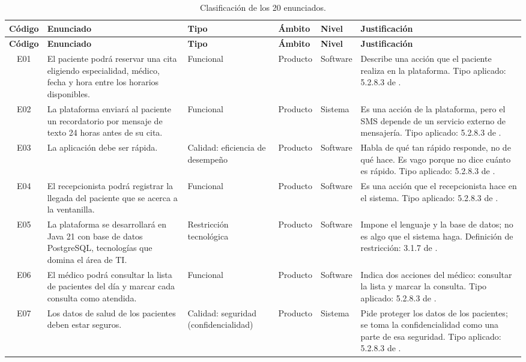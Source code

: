 \documentclass[11pt,a4paper]{article}
\begin{document}
\begingroup\footnotesize
\setlength{\tabcolsep}{3pt}
\renewcommand{\arraystretch}{1.18}
\begin{longtable}{|c|L{4.0cm}|L{2.3cm}|L{1.7cm}|L{1.7cm}|L{3.4cm}|}
\caption{Clasificación de los 20 enunciados.}\label{tab:clasificacion}\\
\hline
\textbf{Código} & \textbf{Enunciado} & \textbf{Tipo} & \textbf{Ámbito} & \textbf{Nivel} & \textbf{Justificación} \\
\hline
\endfirsthead
\hline
\textbf{Código} & \textbf{Enunciado} & \textbf{Tipo} & \textbf{Ámbito} & \textbf{Nivel} & \textbf{Justificación} \\
\hline
\endhead
E01 & El paciente podrá reservar una cita eligiendo especialidad, médico, fecha y hora entre los horarios disponibles. & Funcional & Producto & Software & Describe una acción que el paciente realiza en la plataforma. Tipo aplicado: 5.2.8.3 de \cite{iso29148}. \\ \hline
E02 & La plataforma enviará al paciente un recordatorio por mensaje de texto 24 horas antes de su cita. & Funcional & Producto & Sistema & Es una acción de la plataforma, pero el SMS depende de un servicio externo de mensajería. Tipo aplicado: 5.2.8.3 de \cite{iso29148}. \\ \hline
E03 & La aplicación debe ser rápida. & Calidad: eficiencia de desempeño & Producto & Software & Habla de qué tan rápido responde, no de qué hace. Es vago porque no dice cuánto es rápido. Tipo aplicado: 5.2.8.3 de \cite{iso29148}. \\ \hline
E04 & El recepcionista podrá registrar la llegada del paciente que se acerca a la ventanilla. & Funcional & Producto & Software & Es una acción que el recepcionista hace en el sistema. Tipo aplicado: 5.2.8.3 de \cite{iso29148}. \\ \hline
E05 & La plataforma se desarrollará en Java 21 con base de datos PostgreSQL, tecnologías que domina el área de TI. & Restricción tecnológica & Producto & Software & Impone el lenguaje y la base de datos; no es algo que el sistema haga. Definición de restricción: 3.1.7 de \cite{iso29148}. \\ \hline
E06 & El médico podrá consultar la lista de pacientes del día y marcar cada consulta como atendida. & Funcional & Producto & Software & Indica dos acciones del médico: consultar la lista y marcar la consulta. Tipo aplicado: 5.2.8.3 de \cite{iso29148}. \\ \hline
E07 & Los datos de salud de los pacientes deben estar seguros. & Calidad: seguridad (confidencialidad) & Producto & Sistema & Pide proteger los datos de los pacientes; se toma la confidencialidad como una parte de esa seguridad. Tipo aplicado: 5.2.8.3 de \cite{iso29148}. \\ \hline

\end{longtable}
\end{document}
